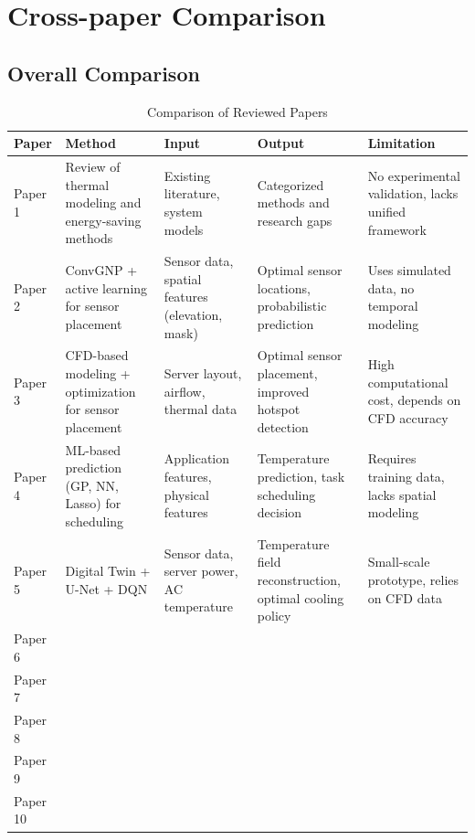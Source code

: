 \documentclass[12pt,a4paper]{article}
\begin{document}
\section{Cross-paper Comparison}

    \subsection{Overall Comparison}
    
                \begin{table}[h]
                    \centering
                    \caption{Comparison of Reviewed Papers}
                        \begin{tabular}{p{2cm} p{3cm} p{3cm} p{3cm} p{3cm}}
                        \toprule
                        Paper & Method & Input & Output & Limitation \\
                        \midrule
                        Paper 1 & Review of thermal modeling and energy-saving methods & Existing literature, system models & Categorized methods and research gaps & No experimental validation, lacks unified framework \\
                        
                        Paper 2 & ConvGNP + active learning for sensor placement & Sensor data, spatial features (elevation, mask) & Optimal sensor locations, probabilistic prediction & Uses simulated data, no temporal modeling \\
                        
                        Paper 3 & CFD-based modeling + optimization for sensor placement & Server layout, airflow, thermal data & Optimal sensor placement, improved hotspot detection & High computational cost, depends on CFD accuracy \\
                        
                        Paper 4 & ML-based prediction (GP, NN, Lasso) for scheduling & Application features, physical features & Temperature prediction, task scheduling decision & Requires training data, lacks spatial modeling \\
                        
                        Paper 5 & Digital Twin + U-Net + DQN & Sensor data, server power, AC temperature & Temperature field reconstruction, optimal cooling policy & Small-scale prototype, relies on CFD data \\
                        
                        Paper 6 &  &  &  &  \\
                        Paper 7 &  &  &  &  \\
                        Paper 8 &  &  &  &  \\
                        Paper 9 &  &  &  &  \\
                        Paper 10 &  &  &  &  \\
                        \bottomrule
                        \end{tabular}
                \end{table}
\end{document}
